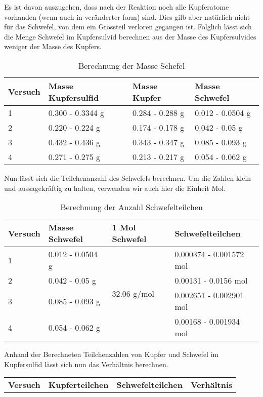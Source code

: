 \documentclass[11pt,paper=a4,final]{scrartcl}
\begin{document}
{Es ist davon auszugehen, dass nach der Reaktion noch alle Kupferatome vorhanden
(wenn auch in ver\"anderter form) sind. Dies gilb aber nat\"urlich nicht f\"ur
das Schwefel, von dem ein Grossteil verloren gegangen ist. Folglich l\"asst sich
die Menge Schwefel im Kupfersulvid berechnen aus der Masse des Kupfersulvides
weniger der Masse des Kupfers.
\begin{table}[h!]
  \begin{tabular}{|l|l|l|l|}\hline
  \bf Versuch & \bf Masse Kupfersulfid & \bf Masse Kupfer & \bf Masse Schwefel
  \\ \hline
  1 & 0.300 - 0.3344 g	& 0.284 - 0.288 g	& 0.012 - 0.0504 g \\ \hline
  2 & 0.220 - 0.224 g	& 0.174 - 0.178 g	& 0.042 - 0.05 g \\ \hline
  3 & 0.432 - 0.436 g	& 0.343 - 0.347 g	& 0.085 - 0.093 g \\ \hline
  4 & 0.271 - 0.275 g	& 0.213 - 0.217 g	& 0.054 - 0.062 g \\ \hline
  \end{tabular}
  \caption{Berechnung der Masse Schefel}
  \label{tab:schwefel}
\end{table}
Nun l\"asst sich die Teilchenanzahl des Schwefels berechnen. Um die Zahlen klein
und aussagekr\"aftig zu halten, verwenden wir auch hier die Einheit Mol.
\begin{table}[h!]
  \begin{tabular}{|l|l|l|l|}\hline
    \bf Versuch & \bf Masse Schwefel & \bf 1 Mol Schwefel & \bf Schwefelteilchen
    \\ \hline
    1 & 0.012 - 0.0504 g & \multirow{4}{*}{32.06 g/mol} & 0.000374 - 0.001572
    mol \\ \cline{1-2} \cline{4-4}
    2 & 0.042 - 0.05 g & & 0.00131 - 0.0156 mol \\ \cline{1-2} \cline{4-4}
    3 & 0.085 - 0.093 g & & 0.002651 - 0.002901 mol \\ \cline{1-2} \cline{4-4}
    4 & 0.054 - 0.062 g & & 0.00168 - 0.001934 mol \\ \hline
  \end{tabular}
  \caption{Berechnung der Anzahl Schwefelteilchen}
  \label{tab:schwefelteilchen}
\end{table}
Anhand der Berechneten Teilchenzahlen von Kupfer und Schwefel im Kupfersulfid
l\"asst sich nun das Verh\"altnis berechnen.
\begin{table}[h!]
  \begin{tabular}{|l|l|l|l|} \hline
    \bf Versuch & \bf Kupferteilchen & \bf Schwefelteilchen & \bf Verh\"altnis \\

\end{tabular}
\end{table}}
\end{document}
